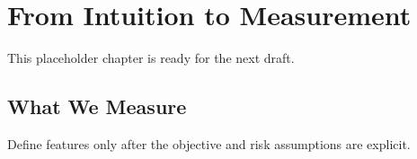 \chapter{From Intuition to Measurement}

This placeholder chapter is ready for the next draft.

\section{What We Measure}

Define features only after the objective and risk assumptions are explicit.
